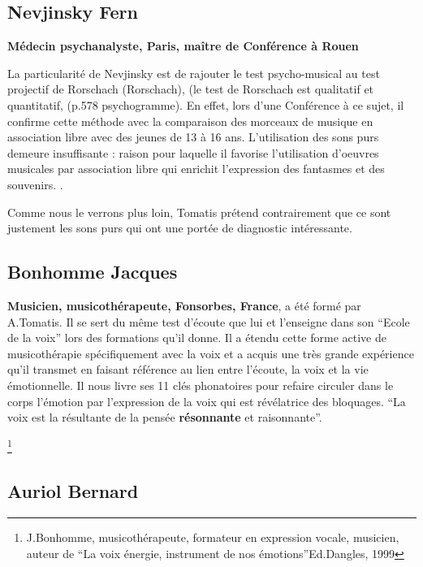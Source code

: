\subsection{ Nevjinsky Fern}
\textbf{Médecin psychanalyste, 
  Paris, maître de Conférence à Rouen}

 La particularité de Nevjinsky est de rajouter le test psycho-musical
 au test projectif de Rorschach (\gls{Rorschach}), (le test de
 Rorschach est qualitatif et quantitatif, (p.578 psychogramme).
 En effet, lors d'une
 Conférence à ce sujet, il confirme cette méthode 
 avec la comparaison des morceaux de musique en association libre avec
 des jeunes de 13 à 16 ans. 
 L'utilisation des sons purs demeure insuffisante : raison pour
 laquelle il favorise l'utilisation d'oeuvres musicales par
 association libre qui enrichit l'expression des fantasmes et des
 souvenirs.
\autocite[Fern Nevjinsky, maître de conférences à l'Université de Rouen, musicien, psycho-analyste. 
``\textit{Comparaison des modalités de projection et d'expression au test de Rorschach et à un test psycho-musical pour des adolescents de 13 à 16 ans}''.]{nevjinsky:adolescence}.  

 Comme nous le verrons plus loin, Tomatis prétend contrairement que ce sont justement les sons purs
qui ont une portée de diagnostic intéressante.

  \subsection{ Bonhomme Jacques } 
  \textbf{Musicien, musicothérapeute,
    Fonsorbes, France}, a été formé par A.Tomatis. Il se sert du même test d'écoute
      que lui et l'enseigne dans son ``Ecole de la voix'' lors des
      formations qu'il donne. Il a étendu cette  forme active de musicothérapie
      spécifiquement avec la voix 
     et a acquis une
      très grande expérience qu'il transmet en   
      faisant référence au lien entre l'écoute, la voix et la vie
      émotionnelle.
      Il nous livre ses 11 clés phonatoires pour refaire circuler dans
      le corps 
      l'émotion par l'expression de la voix qui est révélatrice des bloquages.
``La voix est la
      résultante de la pensée \textbf{résonnante}  et raisonnante''.
     
\footnote{J.Bonhomme, musicothérapeute, formateur 
  	en expression vocale, musicien, auteur de ``La voix énergie,
        instrument de nos émotions''Ed.Dangles, 1999} 

      \subsection{Auriol Bernard}
 
